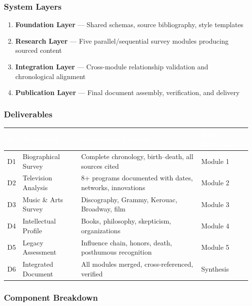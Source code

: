 \documentclass[11pt,letterpaper]{article}
\newcommand{\tableheader}[1]{\textbf{\sffamily\textcolor{white}{#1}}}
\begin{document}
\subsubsection{System Layers}

\begin{enumerate}[leftmargin=2em]
\item \textbf{Foundation Layer} --- Shared schemas, source bibliography, style templates
\item \textbf{Research Layer} --- Five parallel/sequential survey modules producing sourced content
\item \textbf{Integration Layer} --- Cross-module relationship validation and chronological alignment
\item \textbf{Publication Layer} --- Final document assembly, verification, and delivery
\end{enumerate}

\subsubsection{Deliverables}

\begin{center}
\begin{tabularx}{\textwidth}{C{0.8cm}L{3.5cm}XL{3cm}}
\toprule
{}
\tableheader{\#} & \tableheader{Deliverable} & \tableheader{Acceptance Criteria} & \tableheader{Spec Reference} \\
\midrule
D1 & Biographical Survey & Complete chronology, birth--death, all sources cited & Module 1 \\
D2 & Television Analysis & 8+ programs documented with dates, networks, innovations & Module 2 \\
D3 & Music \& Arts Survey & Discography, Grammy, Kerouac, Broadway, film & Module 3 \\
D4 & Intellectual Profile & Books, philosophy, skepticism, organizations & Module 4 \\
D5 & Legacy Assessment & Influence chain, honors, death, posthumous recognition & Module 5 \\
D6 & Integrated Document & All modules merged, cross-referenced, verified & Synthesis \\
\bottomrule
\end{tabularx}
\end{center}

\subsubsection{Component Breakdown}
\end{document}
